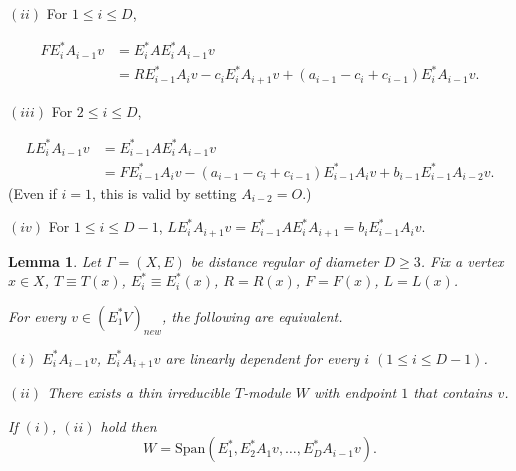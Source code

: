 \documentclass[
]{book}
\newtheorem{lemma}{Lemma}[chapter]
\theoremstyle{definition}
\theoremstyle{definition}
\theoremstyle{definition}
\theoremstyle{definition}
\theoremstyle{remark}
\begin{document}
\((ii)\) For \(1\leq i\leq D\),

\begin{align}
FE^*_iA_{i-1}v & = E^*_{i}AE^*_iA_{i-1}v\\
& = RE^*_{i-1}A_iv - c_iE^*_iA_{i+1}v + (a_{i-1}-c_i+c_{i-1})E^*_iA_{i-1}v.
\end{align}

\((iii)\) For \(2\leq i\leq D\),

\begin{align}
LE^*_iA_{i-1}v & = E^*_{i-1}AE^*_{i}A_{i-1}v\\
& = FE^*_{i-1}A_iv - (a_{i-1}-c_i+c_{i-1})E^*_{i-1}A_i v + b_{i-1}E^*_{i-1}A_{i-2}v.
\end{align}
(Even if \(i=1\), this is valid by setting \(A_{i-2}=O\).)

\((iv)\) For \(1\leq i\leq D-1\), \(LE^*_iA_{i+1}v = E^*_{i-1}AE^*_i A_{i+1} = b_iE^*_{i-1}A_iv\).

\begin{lemma}
\protect\hypertarget{lem:generator-endpoint1-mod}{}\label{lem:generator-endpoint1-mod}Let \(\Gamma = (X, E)\) be distance regular of diameter \(D\geq 3\). Fix a vertex \(x\in X\), \(T\equiv T(x)\), \(E^*_i\equiv E^*_i(x)\), \(R = R(x)\), \(F = F(x)\), \(L = L(x)\).

For every \(v\in (E^*_1V)_{new}\), the following are equivalent.

\((i)\) \(E^*_iA_{i-1}v\), \(E^*_{i}A_{i+1}v\) are linearly dependent for every \(i\) \((1\leq i\leq D-1)\).

\((ii)\) There exists a thin irreducible \(T\)-module \(W\) with endpoint \(1\) that contains \(v\).

If \((i)\), \((ii)\) hold then
\[W = \mathrm{Span}(E^*_1, E^*_2A_1v, \ldots, E^*_DA_{i-1}v).\]
\end{lemma}
\end{document}
